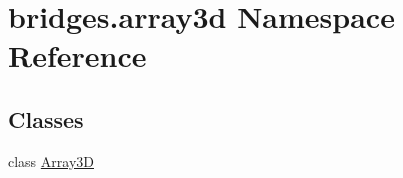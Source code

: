 \hypertarget{namespacebridges_1_1array3d}{}\section{bridges.\+array3d Namespace Reference}
\label{namespacebridges_1_1array3d}
\subsection*{Classes}
\begin{DoxyCompactItemize}
\item 
class \hyperlink{classbridges_1_1array3d_1_1_array3_d}{Array3D}
\end{DoxyCompactItemize}
